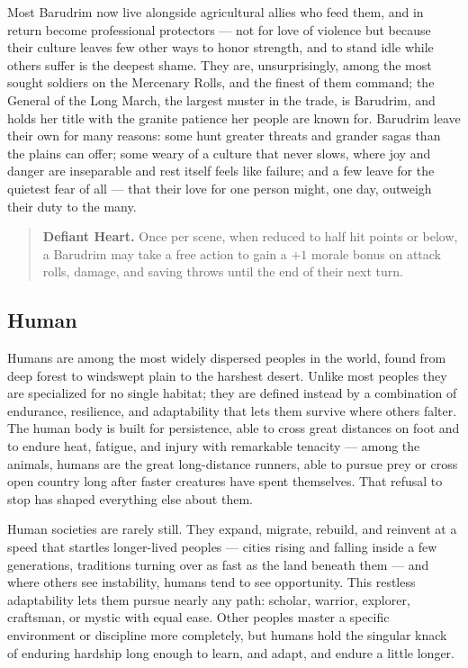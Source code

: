 Most Barudrim now live alongside agricultural allies who feed them, and in return become professional protectors --- not for love of violence but because their culture leaves few other ways to honor strength, and to stand idle while others suffer is the deepest shame. They are, unsurprisingly, among the most sought soldiers on the Mercenary Rolls, and the finest of them command; the General of the Long March, the largest muster in the trade, is Barudrim, and holds her title with the granite patience her people are known for. Barudrim leave their own for many reasons: some hunt greater threats and grander sagas than the plains can offer; some weary of a culture that never slows, where joy and danger are inseparable and rest itself feels like failure; and a few leave for the quietest fear of all --- that their love for one person might, one day, outweigh their duty to the many.

\begin{quote}
\textbf{Defiant Heart.} Once per scene, when reduced to half hit points or below, a Barudrim may take a free action to gain a $+1$ morale bonus on attack rolls, damage, and saving throws until the end of their next turn.
\end{quote}

\subsection{Human}

Humans are among the most widely dispersed peoples in the world, found from deep forest to windswept plain to the harshest desert. Unlike most peoples they are specialized for no single habitat; they are defined instead by a combination of endurance, resilience, and adaptability that lets them survive where others falter. The human body is built for persistence, able to cross great distances on foot and to endure heat, fatigue, and injury with remarkable tenacity --- among the animals, humans are the great long-distance runners, able to pursue prey or cross open country long after faster creatures have spent themselves. That refusal to stop has shaped everything else about them.

Human societies are rarely still. They expand, migrate, rebuild, and reinvent at a speed that startles longer-lived peoples --- cities rising and falling inside a few generations, traditions turning over as fast as the land beneath them --- and where others see instability, humans tend to see opportunity. This restless adaptability lets them pursue nearly any path: scholar, warrior, explorer, craftsman, or mystic with equal ease. Other peoples master a specific environment or discipline more completely, but humans hold the singular knack of enduring hardship long enough to learn, and adapt, and endure a little longer.


